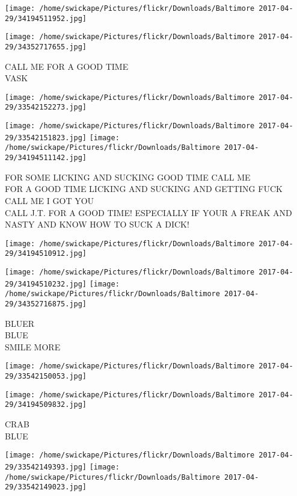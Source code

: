 \documentclass[10pt,letterpaper]{article}
\begin{document}
\texttt{[image: /home/swickape/Pictures/flickr/Downloads/Baltimore 2017-04-29/34194511952.jpg]}

\vspace{0.25in}
\texttt{[image: /home/swickape/Pictures/flickr/Downloads/Baltimore 2017-04-29/34352717655.jpg]}

CALL ME FOR A GOOD TIME\\
VASK
\pagebreak

\texttt{[image: /home/swickape/Pictures/flickr/Downloads/Baltimore 2017-04-29/33542152273.jpg]}

\vspace{0.25in}
\texttt{[image: /home/swickape/Pictures/flickr/Downloads/Baltimore 2017-04-29/33542151823.jpg]}
\texttt{[image: /home/swickape/Pictures/flickr/Downloads/Baltimore 2017-04-29/34194511142.jpg]}

FOR SOME LICKING AND SUCKING GOOD TIME CALL ME\\
FOR A GOOD TIME LICKING AND SUCKING AND GETTING FUCK CALL ME I GOT YOU\\
CALL J.T. FOR A GOOD TIME!   ESPECIALLY IF YOUR A FREAK AND NASTY AND KNOW HOW TO SUCK A DICK!
\pagebreak

\texttt{[image: /home/swickape/Pictures/flickr/Downloads/Baltimore 2017-04-29/34194510912.jpg]}

\vspace{0.25in}
\texttt{[image: /home/swickape/Pictures/flickr/Downloads/Baltimore 2017-04-29/34194510232.jpg]}
\texttt{[image: /home/swickape/Pictures/flickr/Downloads/Baltimore 2017-04-29/34352716875.jpg]}

BLUER\\
BLUE\\
SMILE MORE
\pagebreak

\texttt{[image: /home/swickape/Pictures/flickr/Downloads/Baltimore 2017-04-29/33542150053.jpg]}

\vspace{0.25in}
\texttt{[image: /home/swickape/Pictures/flickr/Downloads/Baltimore 2017-04-29/34194509832.jpg]}

CRAB\\
BLUE
\pagebreak

\texttt{[image: /home/swickape/Pictures/flickr/Downloads/Baltimore 2017-04-29/33542149393.jpg]}
\texttt{[image: /home/swickape/Pictures/flickr/Downloads/Baltimore 2017-04-29/33542149023.jpg]}
\end{document}
